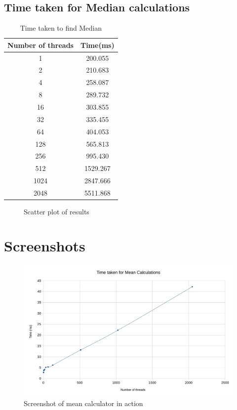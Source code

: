 \documentclass{article}
\begin{document}
    	\subsection{Time taken for Median calculations}
    	\begin{table}[H]
	    	\begin{center}
	    	\begin{tabular}{c | c }
	    	\textbf{Number of threads} & \textbf{Time(ms)} \\ \hline
	    	1 & 200.055 \\
			2 & 210.683 \\
			4 & 258.087 \\
			8 & 289.732 \\
			16 & 303.855 \\
			32 & 335.455 \\
			64 & 404.053 \\
			128 & 565.813 \\
			256 & 995.430 \\
			512 & 1529.267 \\
			1024 & 2847.666 \\
			2048 & 5511.868 
	    	\end{tabular}
	    	\caption{Time taken to find Median}
	    	\end{center}
    	\end{table}

    	\begin{figure}[H]
			\caption{Scatter plot of results}
    	\end{figure}

    \section{Screenshots}
    	\begin{figure}[H]
    		\centering
    		\includegraphics[width=\linewidth]{mean_graph.png}
    		\caption{Screenshot of mean calculator in action}
    	\end{figure}
\end{document}
